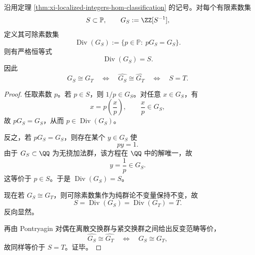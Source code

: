 \begin{theorem}[有限素数局部化群的可除素数恢复与拓扑分类刚性]\label{thm:xi-localized-integers-divisibility-topological-rigidity}
沿用定理 \ref{thm:xi-localized-integers-hom-classification} 的记号。对每个有限素数集
\[
S\subset\mathbb P,
\qquad
G_S:=\ZZ[S^{-1}],
\]
定义其可除素数集
\[
\operatorname{Div}(G_S):=\{p\in\mathbb P:\ pG_S=G_S\}.
\]
则有严格恒等式
\[
\boxed{\;
\operatorname{Div}(G_S)=S.\;}
\]
因此
\[
\boxed{\;
G_S\cong G_T
\quad\Longleftrightarrow\quad
\widehat{G_S}\cong \widehat{G_T}
\quad\Longleftrightarrow\quad
S=T.\;}
\]
\end{theorem}
\begin{proof}
任取素数 \(p\)。若 \(p\in S\)，则 \(1/p\in G_S\)。对任意 \(x\in G_S\)，有
\[
x=p\left(\frac{x}{p}\right),
\qquad
\frac{x}{p}\in G_S,
\]
故 \(pG_S=G_S\)，从而 \(p\in \operatorname{Div}(G_S)\)。

反之，若 \(pG_S=G_S\)，则存在某个 \(y\in G_S\) 使
\[
py=1.
\]
由于 \(G_S\subset\QQ\) 为无挠加法群，该方程在 \(\QQ\) 中的解唯一，故
\[
y=\frac1p\in G_S.
\]
这等价于 \(p\in S\)。于是 \(\operatorname{Div}(G_S)=S\)。

现在若 \(G_S\cong G_T\)，则可除素数集作为纯群论不变量保持不变，故
\[
S=\operatorname{Div}(G_S)=\operatorname{Div}(G_T)=T.
\]
反向显然。

再由 Pontryagin 对偶在离散交换群与紧交换群之间给出反变范畴等价，
\[
\widehat{G_S}\cong \widehat{G_T}
\quad\Longleftrightarrow\quad
G_S\cong G_T,
\]
故同样等价于 \(S=T\)。证毕。
\end{proof}

